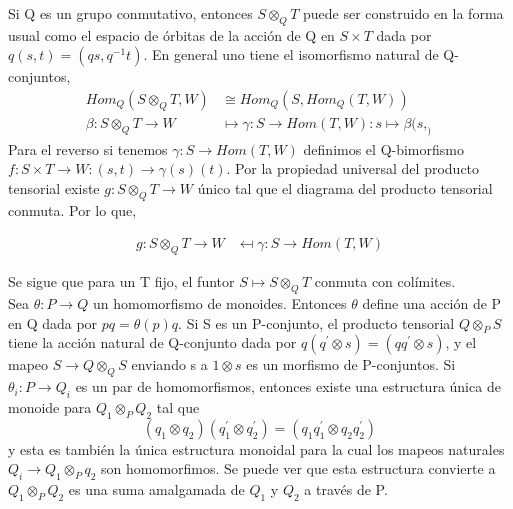 \documentclass[12pt,spanish]{amsart}
\theoremstyle{definition}
\theoremstyle{remark}
\begin{document}
Si Q es un grupo conmutativo, entonces $S\otimes_{Q}T$ puede ser construido en la forma usual como el espacio de órbitas de la acción de Q en $S\times T$ dada por $q(s,t)=(qs,q^{-1}t)$.
En general uno tiene el isomorfismo natural de Q-conjuntos,
\begin{equation*}
\begin{split}
Hom_{Q}(S\otimes_{Q}T,W) &\cong Hom_{Q}(S,Hom_{Q}(T,W)) \\
\beta:S\otimes_{Q}T \to W &\mapsto \gamma:S \to Hom(T,W):s \mapsto \beta(s,_)
\end{split}
\end{equation*}
Para el reverso si tenemos $\gamma:S \to Hom(T,W)$ definimos el Q-bimorfismo $f:S \times T \to W:(s,t)\to \gamma(s)(t)$. Por la propiedad universal del producto tensorial existe $g:S\otimes_{Q}T\to W$ único tal que el diagrama del producto tensorial conmuta. Por lo que,

\begin{equation*}
\begin{split}
g:S\otimes_{Q}T \to W &\mapsfrom \gamma:S \to Hom(T,W) 
\end{split}
\end{equation*}

Se sigue que para un T fijo, el funtor $S \mapsto S\otimes_{Q}T$ conmuta con colímites. \\
Sea $\theta:P \to Q$ un homomorfismo de monoides. Entonces $\theta$ define una acción de P en Q dada por $pq=\theta(p)q$. Si S es un P-conjunto, el producto tensorial $Q\otimes_{P}S$ tiene la acción natural de Q-conjunto dada por $q(q^{\prime}\otimes s)= (qq^{\prime}\otimes s)$, y el mapeo $S \to Q\otimes_{Q}S$ enviando s a $1\otimes s$ es un morfismo de P-conjuntos. Si $\theta_{i}:P \to Q_{i}$ es un par de homomorfismos, entonces existe una estructura única de monoide para $Q_{1}\otimes_{P}Q_{2}$ tal que
$$ (q_{1}\otimes q_{2})(q_{1}^{\prime}\otimes q_{2}^{\prime})= (q_{1}q_{1}^{\prime}\otimes q_{2}q_{2}^{\prime})$$
y esta es también la única estructura monoidal para la cual los mapeos naturales $Q_{i} \to Q_{1}\otimes_{P}q_{2}$ son homomorfimos. Se puede ver que esta estructura convierte a $Q_{1}\otimes_{P}Q_{2}$ es una suma amalgamada de $Q_{1}$ y $Q_{2}$ a través de P. \\
\end{document}

